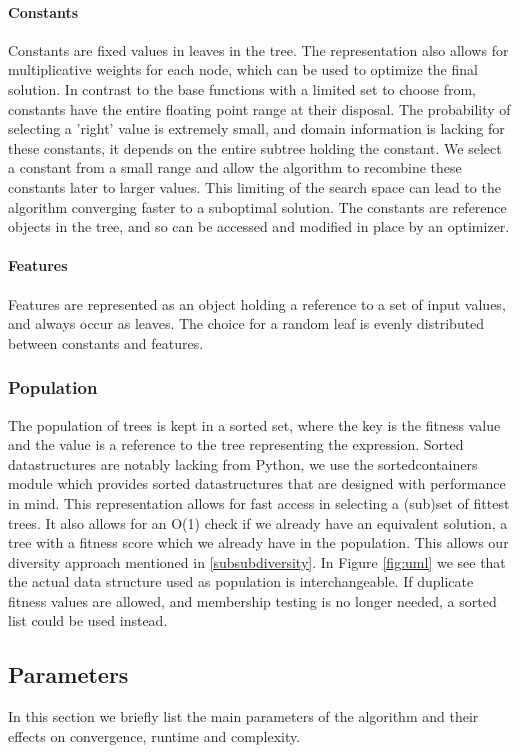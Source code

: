\paragraph{Constants}
Constants are fixed values in leaves in the tree. The representation also allows for multiplicative weights for each node, which can be used to optimize the final solution. In contrast to the base functions with a limited set to choose from, constants have the entire floating point range at their disposal. The probability of selecting a 'right' value is extremely small, and domain information is lacking for these constants, it depends on the entire subtree holding the constant. We select a constant from a small range and allow the algorithm to recombine these constants later to larger values. This limiting of the search space can lead to the algorithm converging faster to a suboptimal solution.
The constants are reference objects in the tree, and so can be accessed and modified in place by an optimizer.

\paragraph{Features}
Features are represented as an object holding a reference to a set of input values, and always occur as leaves. The choice for a random leaf is evenly distributed between constants and features.

\subsubsection{Population}
The population of trees is kept in a sorted set, where the key is the fitness value and the value is a reference to the tree representing the expression.  Sorted datastructures are notably lacking from Python, we use the sortedcontainers \cite{sortedcontainers} module which provides sorted datastructures that are designed with performance in mind. 
This representation allows for fast access in selecting a (sub)set of fittest trees. It also allows for an O(1) check if we already have an equivalent solution, a tree with a fitness score which we already have in the population. This allows our diversity approach mentioned in \ref{subsubdiversity}.
In Figure \ref{fig:uml} we see that the actual data structure used as population is interchangeable. If duplicate fitness values are allowed, and membership testing is no longer needed, a sorted list could be used instead.

\subsection{Parameters}
In this section we briefly list the main parameters of the algorithm and their effects on convergence, runtime and complexity.

